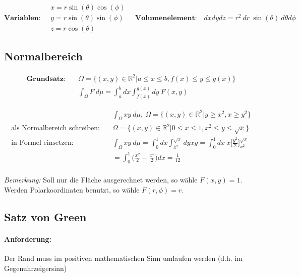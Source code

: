\documentclass[11pt]{article}
\begin{document}
\begin{equation*}
	\textbf{Variablen:}\quad \begin{matrix}
		x = r\sin(\theta)\cos(\phi) \\ y = r\sin(\theta)\sin(\phi) \\ z = r\cos(\theta)
	\end{matrix} \quad \textbf{Volumenelement:}\quad dxdydz = r^2\ dr\ \sin(\theta)\ d\theta d\phi
\end{equation*}

\subsection{Normalbereich}

\begin{equation*}
\begin{split}
	\textbf{Grundsatz:}\quad & \Omega = \{(x,y) \in \mathbb{R}^2| a \leq x \leq b, f(x) \leq y \leq g(x)\} \\
	& \int_\Omega F\ d\mu = \int_a^b dx \int_{f(x)}^{g(x)} dy\ F(x,y)
\end{split}
\end{equation*}

\begin{equation*}
\begin{split}
	& \int_\Omega xy\ d\mu,\ \Omega = \{(x,y) \in \mathbb{R}^2| y \geq x^2, x \geq y^2 \} \\
	\text{als Normalbereich schreiben:}\quad & \Omega = \{(x,y) \in \mathbb{R}^2| 0 \leq x \leq 1, x^2 \leq y \leq \sqrt{x}\} \\
	\text{in Formel einsetzen:}\quad & \int_\Omega xy\ d\mu = \int_0^1 dx\int_{x^2}^{\sqrt{x}} dyxy = \int_0^1 dx\ x \Big[\frac{y^2}{2}\Big]_{x^2}^{\sqrt{x}} \\
	& = \int_0^1 \Big(\frac{x^2}{2}-\frac{x^5}{2}\Big)dx = \frac{1}{12} \\
\end{split}
\end{equation*}

\emph{Bemerkung:} Soll nur die Fläche ausgerechnet werden, so wähle $F(x,y) = 1$. Werden Polarkoordinaten benutzt, so wähle $F(r, \phi) = r$.

\subsection{Satz von Green}

\paragraph{Anforderung:} Der Rand muss im positiven mathematischen Sinn umlaufen werden (d.h. im Gegenuhrzeigersinn)
\end{document}
